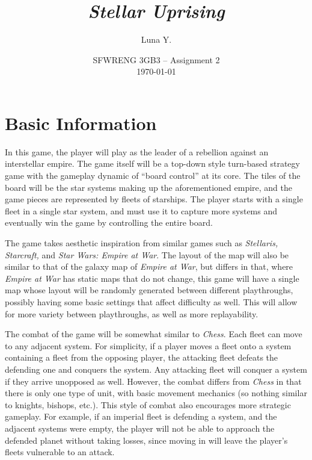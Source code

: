 \documentclass[10pt]{article}
\begin{document}
\title{\textit{Stellar Uprising}}
\author{Luna Y.}
\date{
    SFWRENG 3GB3 -- Assignment 2\\[0.25cm]
    \today
}
\maketitle

\tableofcontents

\section{Basic Information}

In this game, the player will play as the leader of a rebellion against an interstellar empire. The game itself will be a top-down style
turn-based strategy game with the gameplay dynamic of ``board control'' at its core. The tiles of the board will be the star systems
making up the aforementioned empire, and the game pieces are represented by fleets of starships. The player starts with a single fleet
in a single star system, and must use it to capture more systems and eventually win the game by controlling the entire board.

The game takes aesthetic inspiration from similar games such as \textit{Stellaris, Starcraft,} and \textit{Star Wars: Empire at War}.
The layout of the map will also be similar to that of the galaxy map of \textit{Empire at War}, but differs in that, where \textit{Empire at War}
has static maps that do not change, this game will have a single map whose layout will be randomly generated between different playthroughs,
possibly having some basic settings that affect difficulty as well. This will allow for more variety between playthroughs, as well as more replayability.

The combat of the game will be somewhat similar to \textit{Chess}. Each fleet can move to any adjacent system.
For simplicity, if a player moves a fleet onto a system containing a fleet from the opposing player, the attacking
fleet defeats the defending one and conquers the system. Any attacking fleet will conquer a system if they arrive unopposed as well.
However, the combat differs from \textit{Chess} in that there is only one type of unit, with basic movement mechanics (so nothing
similar to knights, bishops, etc.). This style of combat also encourages more strategic gameplay. For example, if an imperial fleet
is defending a system, and the adjacent systems were empty, the player will not be able to approach the defended planet without taking losses,
since moving in will leave the player's fleets vulnerable to an attack.
\end{document}
